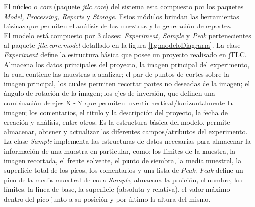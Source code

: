El n\'ucleo o \textit{core} (paquete \textit{jtlc.core}) del sistema esta compuesto por los paquetes \textit{Model, Processing, Reports} y \textit{Storage}.
Estos m\'odulos brindan las herramientas b\'asicas que permiten el an\'alisis de las muestras y la generaci\'on de reportes.\\
El modelo est\'a compuesto por 3 clases: \textit{Experiment, Sample} y \textit{Peak} pertenecientes al paquete \textit{jtlc.core.model} detallado en la figura \ref{fig:modeloDiagrama}. La clase \textit{Experiment} define la estructura b\'asica que posee un proyecto realizado en jTLC. Almacena los datos principales del proyecto, la imagen principal del experimento, la cual contiene las muestras a analizar; el par de puntos de cortes sobre la imagen principal, los cuales permiten recortar partes no deseadas de la imagen; el \'angulo de rotaci\'on de la imagen; los ejes de inversi\'on, que definen una combinaci\'on de ejes X - Y que permiten invertir vertical/horizontalmente la imagen; los comentarios, el titulo y la descripci\'on del proyecto, la fecha de creaci\'on y an\'alisis, entre otros. Es la estructura b\'asica del modelo, permite almacenar, obtener y actualizar los diferentes campos/atributos del experimento.
La clase \textit{Sample} implementa las estructuras de datos necesarias para almacenar la informaci\'on de una muestra en particular, como: los l\'imites de la muestra, la imagen recortada, el frente solvente, el punto de siembra, la media muestral, la superficie total de los picos, los comentarios y una lista de \textit{Peak}. \textit{Peak} define un pico de la media muestral de cada \textit{Sample}, almacena la posici\'on, el nombre, los l\'imites, la linea de base, la superficie (absoluta y relativa), el valor m\'aximo dentro del pico junto a su posici\'on y por \'ultimo la altura del mismo.

